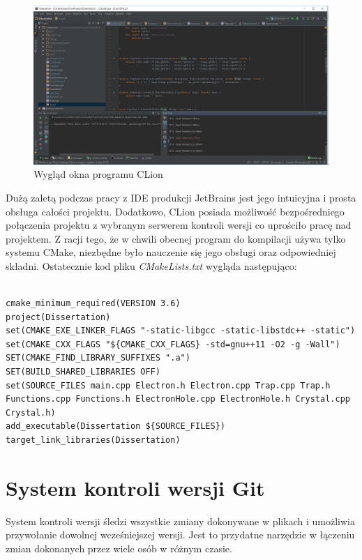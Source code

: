 \begin{figure}[h]
\centering
\includegraphics[width=17cm]{clion}
\caption{Wygląd okna programu CLion \cite{struktura_pasmowa}}
\label{fig:clion}
\end{figure}

Dużą zaletą podczas pracy z IDE produkcji JetBrains jest jego intuicyjna i prosta obsługa całości projektu. Dodatkowo, CLion posiada możliwość bezpośredniego połączenia projektu z wybranym serwerem kontroli wersji co uprościło pracę nad projektem. Z racji tego, że w chwili obecnej program do kompilacji używa tylko systemu CMake, niezbędne było nauczenie się jego obsługi  oraz odpowiedniej składni.
Ostatecznie kod pliku \emph{CMakeLists.txt} wygląda następująco:
\begin{verbatim}

cmake_minimum_required(VERSION 3.6)
project(Dissertation)
set(CMAKE_EXE_LINKER_FLAGS "-static-libgcc -static-libstdc++ -static")
set(CMAKE_CXX_FLAGS "${CMAKE_CXX_FLAGS} -std=gnu++11 -O2 -g -Wall")
SET(CMAKE_FIND_LIBRARY_SUFFIXES ".a")
SET(BUILD_SHARED_LIBRARIES OFF)
set(SOURCE_FILES main.cpp Electron.h Electron.cpp Trap.cpp Trap.h Functions.cpp Functions.h ElectronHole.cpp ElectronHole.h Crystal.cpp Crystal.h)
add_executable(Dissertation ${SOURCE_FILES})
target_link_libraries(Dissertation)

\end{verbatim}
\section{System kontroli wersji Git}

System kontroli wersji śledzi wszystkie zmiany dokonywane w plikach i umożliwia przywołanie dowolnej wcześniejszej wersji. Jest to przydatne narzędzie w łączeniu zmian dokonanych przez wiele osób w różnym czasie.

